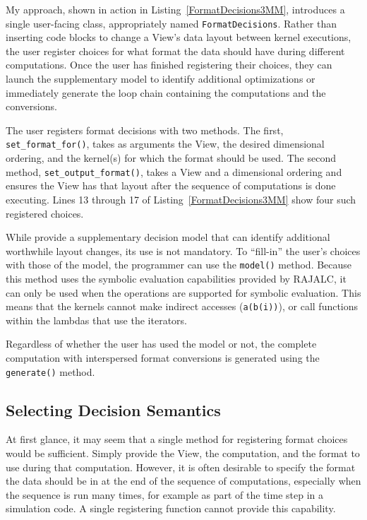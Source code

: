 My approach, shown in action in Listing~\ref{FormatDecisions3MM}, introduces a single user-facing class, appropriately named \verb.FormatDecisions..
Rather than inserting code blocks to change a View's data layout between kernel executions, the user register choices for what format the data should have during different computations. 
Once the user has finished registering their choices, they can launch the supplementary model to identify additional optimizations or immediately generate the loop chain containing the computations and the conversions.

The user registers format decisions with two methods.
The first, \verb.set_format_for()., takes as arguments the View, the desired dimensional ordering, and the kernel(s) for which the format should be used.
The second method, \verb.set_output_format()., takes a View and a dimensional ordering and ensures the View has that layout after the sequence of computations is done executing.
Lines 13 through 17 of Listing~\ref{FormatDecisions3MM} show four such registered choices.


While \FormatDecisions{} provide a supplementary decision model that can identify additional worthwhile layout changes, its use is not mandatory.
To ``fill-in'' the user's choices with those of the model, the programmer can use the \verb.model(). method.
Because this method uses the symbolic evaluation capabilities provided by RAJALC, it can only be used when the operations are supported for symbolic evaluation.
This means that the kernels cannot make indirect accesses (\verb.a(b(i)).), or call functions within the lambdas that use the iterators.

Regardless of whether the user has used the model or not, 
the complete computation with interspersed format conversions is generated using the \verb.generate(). method.

\subsection{Selecting Decision Semantics}

At first glance, it may seem that a single method for registering format choices would be sufficient. 
Simply provide the View, the computation, and the format to use during that computation.
However, it is often desirable to specify the format the data should be in at the end of the sequence of computations, especially when the sequence is run many times, for example as part of the time step in a simulation code.
A single registering function cannot provide this capability. 

